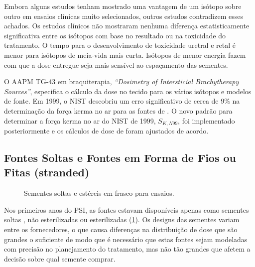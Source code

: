 \documentclass[11pt,a4paper]{article}
\begin{document}
	Embora alguns estudos tenham mostrado uma vantagem de um isótopo sobre outro em ensaios clínicas muito selecionados, outros estudos contradizem esses achados. Os estudos clínicos não mostraram nenhuma diferença estatisticamente significativa entre os isótopos com base no resultado ou na toxicidade do tratamento. O tempo para o desenvolvimento de toxicidade uretral e retal é menor para isótopos de meia-vida mais curta. Isótopos de menor energia fazem com que a dose entregue seja mais sensível ao espaçamento das sementes.

	O AAPM TG-43 em braquiterapia, \textit{``Dosimetry of Intersticial Brachytherapy Sources''}, especifica o cálculo da dose no tecido para os vários isótopos e modelos de fonte. Em 1999, o NIST descobriu um erro significativo de cerca de 9\% na determinação da força kerma no ar para as fontes de . O novo padrão para determinar a força kerma no ar do NIST de 1999, $S_{K,N99}$, foi implementado posteriormente e os cálculos de dose de  foram ajustados de acordo.

\subsection*{Fontes Soltas e Fontes em Forma de Fios ou Fitas (stranded)}

	\begin{figure}
		\centering
		\caption{Sementes soltas e estéreis em frasco para ensaios.}
		\label{fig:semenstesSoltasAssay}
	\end{figure}

	Nos primeiros anos do PSI, as fontes estavam disponíveis apenas como sementes soltas , não esterilizadas ou esterilizadas (\ref{fig:semenstesSoltasAssay}). Os designs das sementes variam entre os fornecedores, o que causa diferenças na distribuição de dose que são grandes o suficiente de modo que é necessário que estas fontes sejam modeladas com precisão no planejamento do tratamento, mas não tão grandes que afetem a decisão sobre qual semente comprar.
\end{document}
